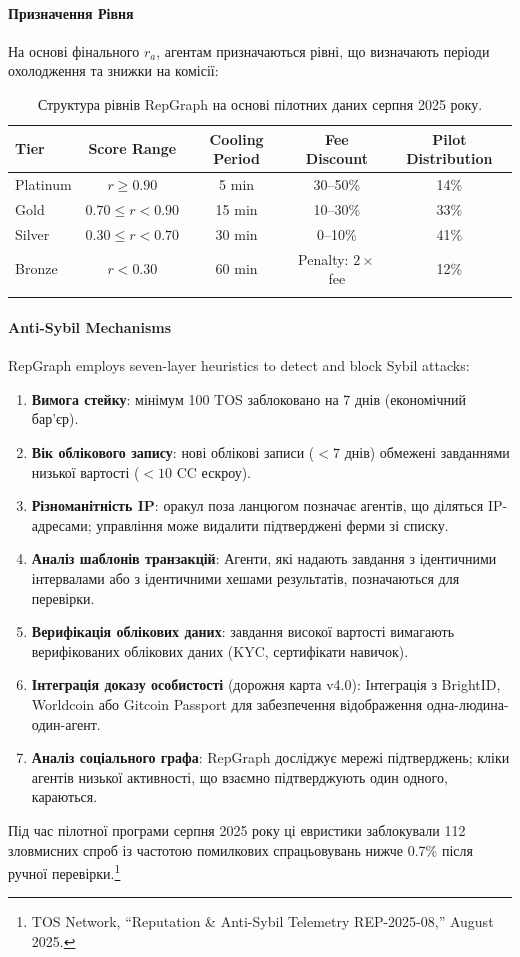 \documentclass[11pt]{article}
\begin{document}
\paragraph{Призначення Рівня} На основі фінального $r_a$, агентам призначаються рівні, що визначають періоди охолодження та знижки на комісії:
\begin{longtable}{@{}lcccc@{}}
\toprule
\textbf{Tier} & \textbf{Score Range} & \textbf{Cooling Period} & \textbf{Fee Discount} & \textbf{Pilot Distribution} \\\midrule
Platinum & $r \geq 0.90$ & 5 min & 30--50\% & 14\% \\
Gold & $0.70 \leq r < 0.90$ & 15 min & 10--30\% & 33\% \\
Silver & $0.30 \leq r < 0.70$ & 30 min & 0--10\% & 41\% \\
Bronze & $r < 0.30$ & 60 min & Penalty: $2 \times$ fee & 12\% \\\bottomrule
\caption{Структура рівнів RepGraph на основі пілотних даних серпня 2025 року.}
\label{tab:reputation-tiers}
\end{longtable}

\paragraph{Anti-Sybil Mechanisms} RepGraph employs seven-layer heuristics to detect and block Sybil attacks:
\begin{enumerate}[noitemsep]
  \item \textbf{Вимога стейку}: мінімум 100 TOS заблоковано на 7 днів (економічний бар'єр).
  \item \textbf{Вік облікового запису}: нові облікові записи ($<7$ днів) обмежені завданнями низької вартості ($<10$ CC ескроу).
  \item \textbf{Різноманітність IP}: оракул поза ланцюгом позначає агентів, що діляться IP-адресами; управління може видалити підтверджені ферми зі списку.
  \item \textbf{Аналіз шаблонів транзакцій}: Агенти, які надають завдання з ідентичними інтервалами або з ідентичними хешами результатів, позначаються для перевірки.
  \item \textbf{Верифікація облікових даних}: завдання високої вартості вимагають верифікованих облікових даних (KYC, сертифікати навичок).
  \item \textbf{Інтеграція доказу особистості} (дорожня карта v4.0): Інтеграція з BrightID, Worldcoin або Gitcoin Passport для забезпечення відображення одна-людина-один-агент.
  \item \textbf{Аналіз соціального графа}: RepGraph досліджує мережі підтверджень; кліки агентів низької активності, що взаємно підтверджують один одного, караються.
\end{enumerate}
Під час пілотної програми серпня 2025 року ці евристики заблокували 112 зловмисних спроб із частотою помилкових спрацьовувань нижче 0.7\% після ручної перевірки.\footnote{TOS Network, ``Reputation \& Anti-Sybil Telemetry REP-2025-08,'' August 2025.}
\end{document}
